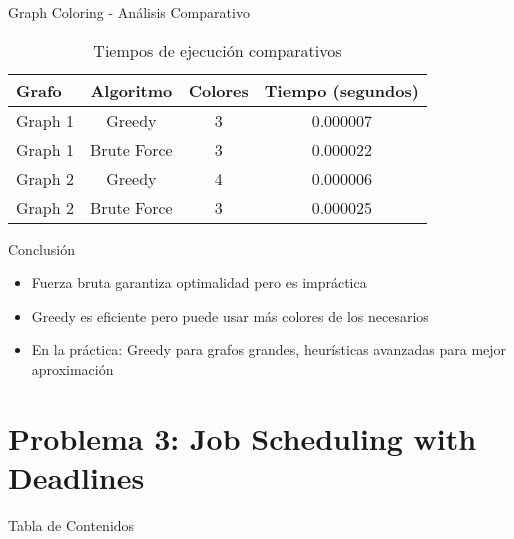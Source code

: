 \documentclass[aspectratio=169]{beamer}
\begin{document}
\begin{frame}{Graph Coloring - Análisis Comparativo}

\begin{table}
\centering
\small
\begin{tabular}{lccc}
\toprule
\textbf{Grafo} & \textbf{Algoritmo} & \textbf{Colores} & \textbf{Tiempo (segundos)} \\
\midrule
Graph 1 & Greedy & 3 & 0.000007 \\
Graph 1 & Brute Force & 3 & 0.000022 \\
Graph 2 & Greedy & 4 & 0.000006 \\
Graph 2 & Brute Force & 3 & 0.000025 \\
\bottomrule
\end{tabular}
\caption{Tiempos de ejecución comparativos}
\end{table}
    
    \begin{block}{Conclusión}
    \begin{itemize}
    \item Fuerza bruta garantiza optimalidad pero es impráctica
    \item Greedy es eficiente pero puede usar más colores de los necesarios
    \item En la práctica: Greedy para grafos grandes, heurísticas avanzadas para mejor aproximación
    \end{itemize}
    \end{block}
\end{frame}

\section{Problema 3: Job Scheduling with Deadlines}

\begin{frame}{Tabla de Contenidos}
\end{frame}
\end{document}
